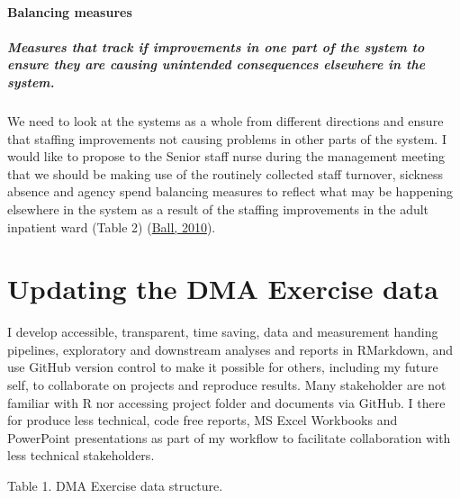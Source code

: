 \documentclass[
]{article}
\begin{document}
\hypertarget{balancing-measures}{%
\paragraph{Balancing measures}\label{balancing-measures}}

\hypertarget{measures-that-track-if-improvements-in-one-part-of-the-system-to-ensure-they-are-causing-unintended-consequences-elsewhere-in-the-system.}{%
\subparagraph{Measures that track if improvements in one part of the
system to ensure they are causing unintended consequences elsewhere in
the
system.}\label{measures-that-track-if-improvements-in-one-part-of-the-system-to-ensure-they-are-causing-unintended-consequences-elsewhere-in-the-system.}}

We need to look at the systems as a whole from different directions and
ensure that staffing improvements not causing problems in other parts of
the system. I would like to propose to the Senior staff nurse during the
management meeting that we should be making use of the routinely
collected staff turnover, sickness absence and agency spend balancing
measures to reflect what may be happening elsewhere in the system as a
result of the staffing improvements in the adult inpatient ward (Table
2) (\protect\hyperlink{ref-ball2010GuidanceSafeNurse}{Ball, 2010}).

\hypertarget{updating-the-dma-exercise-data}{%
\section{Updating the DMA Exercise
data}\label{updating-the-dma-exercise-data}}

I develop accessible, transparent, time saving, data and measurement
handing pipelines, exploratory and downstream analyses and reports in
RMarkdown, and use GitHub version control to make it possible for
others, including my future self, to collaborate on projects and
reproduce results. Many stakeholder are not familiar with R nor
accessing project folder and documents via GitHub. I there for produce
less technical, code free reports, MS Excel Workbooks and PowerPoint
presentations as part of my workflow to facilitate collaboration with
less technical stakeholders.

Table 1. DMA Exercise data structure.
\end{document}
